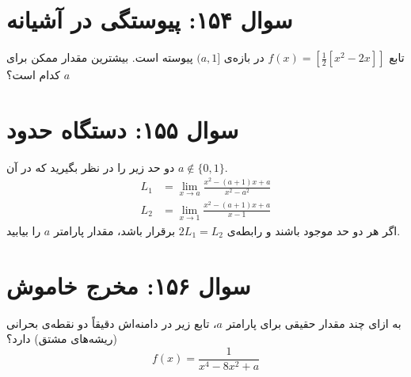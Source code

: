 \documentclass[12pt]{article}
\begin{document}
\vspace{1cm}
\hrulefill
\vspace{1cm}

\section*{سوال ۱۵۴: پیوستگی در آشیانه}
تابع \( f(x) = \left[\frac{1}{2}[x^2-2x]\right] \) در بازه‌ی \( (a, 1] \) پیوسته است. بیشترین مقدار ممکن برای \(a\) کدام است؟

\vspace{1cm}
\hrulefill
\vspace{1cm}

\section*{سوال ۱۵۵: دستگاه حدود}
دو حد زیر را در نظر بگیرید که در آن \( a \notin \{0, 1\} \).
\begin{align*}
	L_1 &= \lim_{x \to a} \frac{x^2 - (a+1)x + a}{x^2 - a^2} \\
	L_2 &= \lim_{x \to 1} \frac{x^2 - (a+1)x + a}{x-1}
\end{align*}
اگر هر دو حد موجود باشند و رابطه‌ی \(2L_1 = L_2\) برقرار باشد، مقدار پارامتر \(a\) را بیابید.

\vspace{1cm}
\hrulefill
\vspace{1cm}

\section*{سوال ۱۵۶: مخرج خاموش}
به ازای چند مقدار حقیقی برای پارامتر \(a\)، تابع زیر در دامنه‌اش دقیقاً دو نقطه‌ی بحرانی (ریشه‌های مشتق) دارد؟
\begin{displaymath}
	f(x) = \frac{1}{x^4 - 8x^2 + a}
\end{displaymath}

\vspace{1cm}
\hrulefill
\vspace{1cm}
\end{document}
